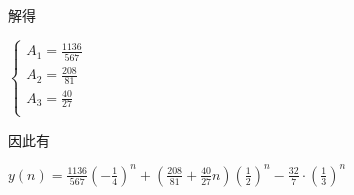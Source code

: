 \documentclass[a4paper,UTF8]{article}
\numberwithin{equation}{section}
\begin{document}
\begin{framed}
\begin{spacing}{1.5}
\begin{itemize}
      解得
      
      $
      \begin{cases}
          A_{1} = \frac{1136}{567} \\
          A_{2} = \frac{208}{81} \\
          A_{3} = \frac{40}{27} \\
      \end{cases}
      $
      
      因此有
      
      $\displaystyle y(n) = \frac{1136}{567} (-\frac{1}{4})^{n} + (\frac{208}{81} + \frac{40}{27}n)(\frac{1}{2})^{n} - \frac{32}{7}\cdot (\frac{1}{3})^{n}$
    \end{itemize}
\end{spacing}
\end{framed}


\newpage
\end{document}
